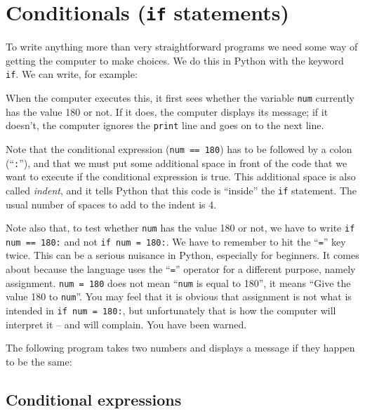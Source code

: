\section{Conditionals (\texttt{if} statements)}

To write anything more than very straightforward programs we need some way
of getting the computer to make choices.
We do this in Python with the keyword \verb!if!.
We can write, for example:


When the computer executes this, it first sees whether the variable \verb!num!
currently has the value 180 or not.  If it does, the computer displays
its message; if it doesn't, the computer ignores the  \verb!print! line
and goes on to the next line.

Note that the conditional expression (\verb!num == 180!) has to be
followed by a colon (``\verb!:!''), and that
we must put some additional space in front of the code that
we want to execute if the conditional expression is true.
This additional space is also called \emph{indent},
and it tells Python that this code is ``inside'' the \texttt{if}
statement. The usual number of spaces to add to the indent is 4.


Note also that, to test whether  \verb!num! has the value 180
or not, we have to write \verb!if num == 180:! and not \verb!if num = 180:!.
We have to remember to hit the ``\texttt{=}'' key twice.
This can be a serious nuisance in Python, especially for beginners.
It comes about because the language uses the ``\texttt{=}'' operator for a different
purpose, namely assignment.  \verb!num = 180! does not mean ``\verb!num! is
equal to 180'', it means ``Give the value 180 to  \verb!num!''.  You may feel
that it is obvious that assignment is not what is intended in
\verb!if num = 180:!, but unfortunately that is
how the computer will interpret it -- and will complain.
You have been warned.

The following program takes two numbers and displays a message if they happen
to be the same:


\pagebreak

\subsection{Conditional expressions}
\label{sec:cond-expr}

